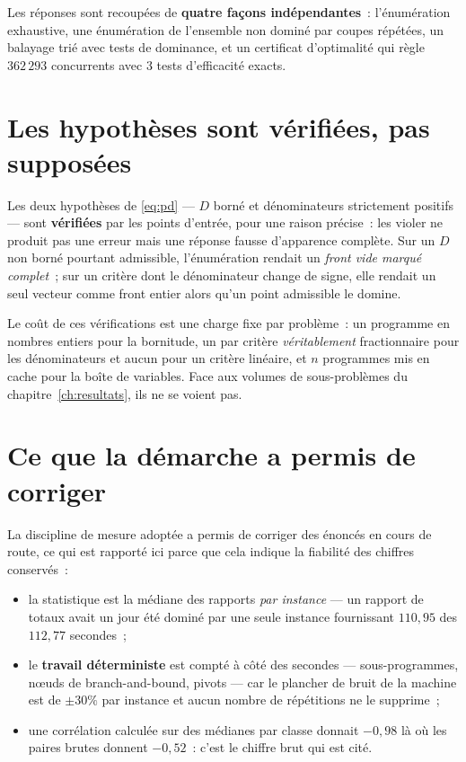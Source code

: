 \documentclass[12pt,a4paper]{report}
\newcommand{\Dset}{D}
\theoremstyle{plain}
\theoremstyle{definition}
\begin{document}
Les réponses sont recoupées de \textbf{quatre façons indépendantes}~:
l'énumération exhaustive, une énumération de l'ensemble non dominé par coupes
répétées, un balayage trié avec tests de dominance, et un certificat
d'optimalité qui règle $362\,293$ concurrents avec $3$ tests d'efficacité
exacts.

\section{Les hypothèses sont vérifiées, pas supposées}

Les deux hypothèses de \eqref{eq:pd} --- $\Dset$ borné et dénominateurs
strictement positifs --- sont \textbf{vérifiées} par les points d'entrée, pour
une raison précise~: les violer ne produit pas une erreur mais une réponse
fausse d'apparence complète.  Sur un $\Dset$ non borné pourtant admissible,
l'énumération rendait un \emph{front vide marqué complet}~; sur un critère dont
le dénominateur change de signe, elle rendait un seul vecteur comme front
entier alors qu'un point admissible le domine.

Le coût de ces vérifications est une charge fixe par problème~: un programme en
nombres entiers pour la bornitude, un par critère \emph{véritablement}
fractionnaire pour les dénominateurs et aucun pour un critère linéaire, et $n$
programmes mis en cache pour la boîte de variables.  Face aux volumes de
sous-problèmes du chapitre~\ref{ch:resultats}, ils ne se voient pas.

\section{Ce que la démarche a permis de corriger}

La discipline de mesure adoptée a permis de corriger des énoncés en cours de
route, ce qui est rapporté ici parce que cela indique la fiabilité des chiffres
conservés~:

\begin{itemize}[itemsep=3pt]
\item la statistique est la médiane des rapports \emph{par instance} --- un
      rapport de totaux avait un jour été dominé par une seule instance
      fournissant $110{,}95$ des $112{,}77$ secondes~;
\item le \textbf{travail déterministe} est compté à côté des secondes ---
      sous-programmes, n{\oe}uds de branch-and-bound, pivots --- car le plancher
      de bruit de la machine est de $\pm 30\%$ par instance et aucun nombre de
      répétitions ne le supprime~;
\item une corrélation calculée sur des médianes par classe donnait $-0{,}98$
      là où les paires brutes donnent $-0{,}52$~: c'est le chiffre brut qui est
      cité.
\end{itemize}
\end{document}
